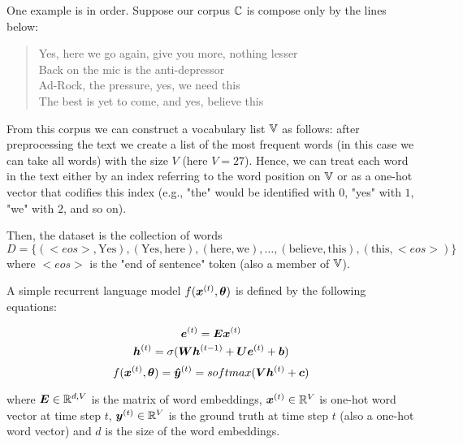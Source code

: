 One example is in order. Suppose our corpus $\mathbb{C}$ is compose only by the lines below:

\begin{quote}
Yes, here we go again, give you more, nothing lesser\\
Back on the mic is the anti-depressor\\
Ad-Rock, the pressure, yes, we need this\\
The best is yet to come, and yes, believe this\\
\end{quote}


From this corpus we can construct a vocabulary list $\mathbb{V}$ as follows: after preprocessing the text we create a list of the most frequent words (in this case we can take all words) with the size $V$ (here $V=27$). Hence, we can treat each word in the text either by an index referring to the word position on $\mathbb{V}$ or as a one-hot vector that codifies this index (e.g., "the" would be identified with $0$, "yes" with $1$, "we" with $2$, and so on).

Then, the dataset is the collection of words 
\[
D = \{(<eos>, \text{Yes}), (\text{Yes}, \text{here}), (\text{here}, \text{we}),\dots,(\text{believe}, \text{this}), (\text{this}, <eos>)\}
\]
where $<eos>$ is the "end of sentence" token (also a member of $\mathbb{V}$).

A simple recurrent language model $f(\bm{x}^{(t)}, \bm{\theta})$ is defined by the following equations:

\begin{equation}
\bm{e}^{(t)} = \bm{E}\bm{x}^{(t)}
\end{equation}
\vspace{0.2cm}
\begin{equation}
\bm{h}^{(t)} = \sigma(\bm{W}\bm{h}^{(t-1)}+ \bm{U}\bm{e}^{(t)}+ \bm{b})
\end{equation}
\vspace{0.2cm}
\begin{equation}
f(\bm{x}^{(t)}, \bm{\theta}) = \bm{\hat{y}}^{(t)} = softmax(\bm{V}\bm{h}^{(t)} + \bm{c})
\end{equation}

where $\bm{E} \in \mathbb{R}^{d,V}$ is the matrix of word embeddings, $\bm{x}^{(t)} \in \mathbb{R}^{V}$ is one-hot word vector at time step $t$, $\bm{y}^{(t)} \in \mathbb{R}^{V}$ is the ground truth at time step $t$ (also a one-hot word vector) and $d$ is the size of the word embeddings.

